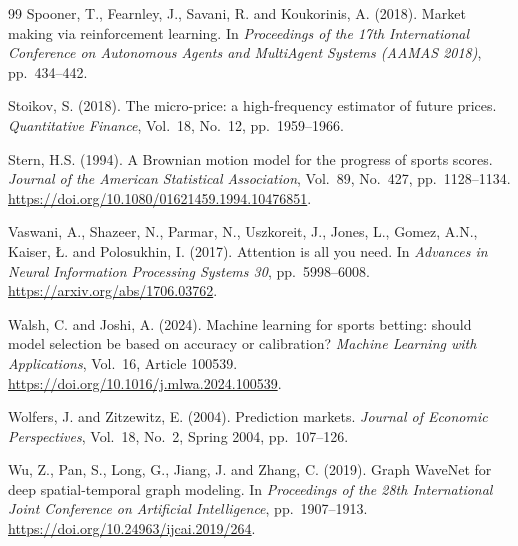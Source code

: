 \documentclass[12pt,a4paper,oneside]{report}
\begin{document}
\begin{thebibliography}{99}
Spooner, T., Fearnley, J., Savani, R. and Koukorinis, A. (2018). Market making via
reinforcement learning. In \textit{Proceedings of the 17th International Conference
on Autonomous Agents and MultiAgent Systems (AAMAS 2018)}, pp.~434--442.

Stoikov, S. (2018). The micro-price: a high-frequency estimator of future prices.
\textit{Quantitative Finance}, Vol.~18, No.~12, pp.~1959--1966.

Stern, H.S. (1994). A Brownian motion model for the progress of sports scores.
\textit{Journal of the American Statistical Association}, Vol.~89, No.~427,
pp.~1128--1134. \url{https://doi.org/10.1080/01621459.1994.10476851}.

Vaswani, A., Shazeer, N., Parmar, N., Uszkoreit, J., Jones, L., Gomez, A.N.,
Kaiser, \L. and Polosukhin, I. (2017). Attention is all you need. In
\textit{Advances in Neural Information Processing Systems 30}, pp.~5998--6008.
\url{https://arxiv.org/abs/1706.03762}.

Walsh, C. and Joshi, A. (2024). Machine learning for sports betting: should
model selection be based on accuracy or calibration? \textit{Machine Learning
with Applications}, Vol.~16, Article 100539.
\url{https://doi.org/10.1016/j.mlwa.2024.100539}.

Wolfers, J. and Zitzewitz, E. (2004). Prediction markets. \textit{Journal of
Economic Perspectives}, Vol.~18, No.~2, Spring 2004, pp.~107--126.

Wu, Z., Pan, S., Long, G., Jiang, J. and Zhang, C. (2019). Graph WaveNet for
deep spatial-temporal graph modeling. In \textit{Proceedings of the 28th
International Joint Conference on Artificial Intelligence}, pp.~1907--1913.
\url{https://doi.org/10.24963/ijcai.2019/264}.

\end{thebibliography}

\appendix
\small
\singlespacing
\end{document}
